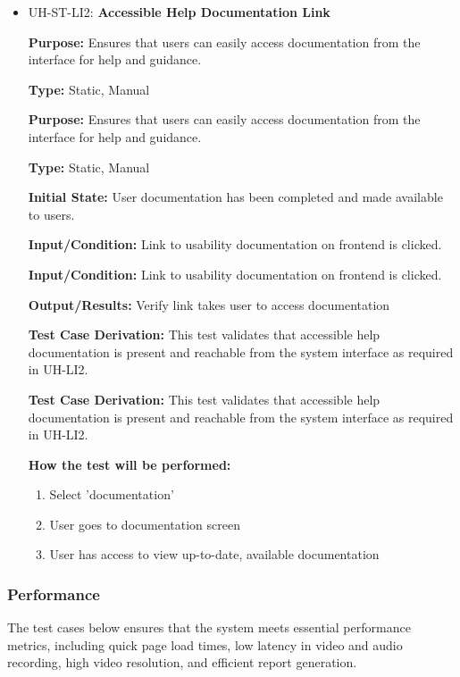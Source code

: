\documentclass[12pt, titlepage]{article}
\begin{document}
\begin{itemize}
  \item UH-ST-LI2: \textbf{Accessible Help Documentation Link}
  \begin{mdframed}[linewidth=0.5mm]
      \textbf{Purpose:} Ensures that users can easily access documentation from the interface for help and guidance. \par
      \textbf{Type:} Static, Manual \par
      \textbf{Purpose:} Ensures that users can easily access documentation from the interface for help and guidance. \par
      \textbf{Type:} Static, Manual \par
      \textbf{Initial State:} User documentation has been completed and made available to users. \par
      \textbf{Input/Condition:} Link to usability documentation on frontend is clicked. \par
      \textbf{Input/Condition:} Link to usability documentation on frontend is clicked. \par
      \textbf{Output/Results:} Verify link takes user to access documentation \par
      \textbf{Test Case Derivation:} This test validates that accessible help documentation is present and reachable from the system interface as required in UH-LI2. \par
      \textbf{Test Case Derivation:} This test validates that accessible help documentation is present and reachable from the system interface as required in UH-LI2. \par
      \textbf{How the test will be performed:}
      \begin{enumerate}[noitemsep]
        \item Select 'documentation'
        \item User goes to documentation screen
        \item User has access to view up-to-date, available documentation
      \end{enumerate}
  \end{mdframed}
\end{itemize}

\subsubsection{Performance}
\hspace{2em}The test cases below ensures that the system meets essential performance metrics, 
including quick page load times, low latency in video and audio recording, high video 
resolution, and efficient report generation. 
\end{document}
